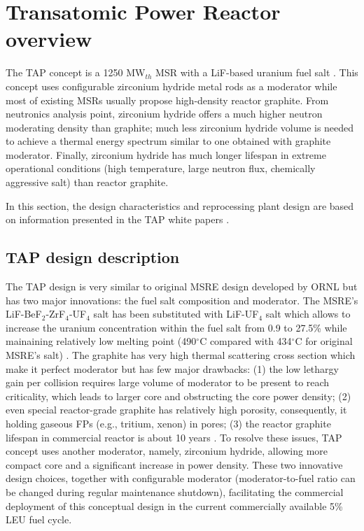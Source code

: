 \section{Transatomic Power Reactor overview}
The \gls{TAP} concept is a 1250 MW$_{th}$ \gls{MSR} with a LiF-based uranium fuel 
salt \cite{transatomic_power_corporation_technical_2016}. This concept uses 
configurable zirconium hydride metal rods as a moderator while most of existing 
\glspl{MSR} usually propose high-density reactor graphite. From neutronics analysis 
point, zirconium hydride offers a much higher neutron moderating density than graphite;
much less zirconium hydride volume is needed to achieve a thermal energy spectrum similar to one obtained with graphite moderator. Finally, zirconium hydride has 
much longer lifespan in extreme operational conditions (high temperature, large 
neutron flux, chemically aggressive salt) than reactor graphite.

In this section, the design characteristics and reprocessing plant design 
are based on information presented in the \gls{TAP} white papers \cite{transatomic_power_corporation_technical_2016, transatomic_power_corporation_neutronics_2016}.

\subsection{TAP design description}
The \gls{TAP} design is very similar to original \gls{MSRE} design developed 
by \gls{ORNL} \cite{haubenreich_experience_1970} but has two major innovations: 
the fuel salt composition and moderator. The \gls{MSRE}'s 
LiF-BeF$_2$-ZrF$_4$-UF$_4$ salt has been substituted with LiF-UF$_4$ salt which 
allows to increase the uranium concentration within the fuel salt from 0.9 to 
27.5\% while mainaining relatively low melting point (490$^{\circ}$C compared 
with 434$^{\circ}$C 
for original \gls{MSRE}'s salt) \cite{betzler_two-dimensional_2016}. The 
graphite has very high 
thermal scattering cross section which make it perfect moderator but has 
few major drawbacks: 
(1) the low lethargy gain per collision requires large volume of moderator 
to be present to reach criticality, which leads to larger core and obstructing 
the core power density; (2) even special 
reactor-grade graphite has relatively high porosity, consequently, it holding 
gaseous \glspl{FP} 
(e.g., tritium, xenon) in pores; (3) the reactor graphite lifespan in commercial 
reactor is about 10 years \cite{robertson_conceptual_1971}. To resolve these 
issues, \gls{TAP} concept uses another 
moderator, namely, zirconium hydride, allowing more compact core and a 
significant increase in power density. These two innovative design choices,  
together with configurable moderator 
(moderator-to-fuel ratio can be changed during regular maintenance shutdown),
 facilitating the commercial deployment of this conceptual design in the current 
commercially available 5\% \gls{LEU} fuel cycle. 

